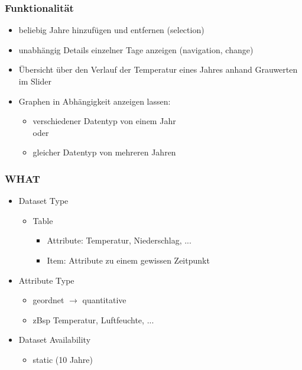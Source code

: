 \documentclass{beamer}
\begin{document}
  \begin{frame}
  \frametitle{Funktionalität}
  \begin{itemize}
    \item beliebig Jahre hinzufügen und entfernen (selection)
    \item unabhängig Details einzelner Tage anzeigen (navigation, change)
    \item Übersicht über den Verlauf der Temperatur eines Jahres anhand Grauwerten im Slider
    \item Graphen in Abhängigkeit anzeigen lassen:
    \begin{itemize}
      \item verschiedener Datentyp von einem Jahr 
      \\ oder
      \item gleicher Datentyp von mehreren Jahren
    \end{itemize}

  \end{itemize}

  \end{frame}

  
  \begin{frame}
  \frametitle{WHAT}
    \begin{itemize}
    \item Dataset Type
      \begin{itemize}
	  \item Table 
	  \begin{itemize}
	   \item Attribute: Temperatur, Niederschlag, ...
	   \item Item: Attribute zu einem gewissen Zeitpunkt
	  \end{itemize}
      \end{itemize}
    \item Attribute Type
      \begin{itemize}
	\item geordnet $\rightarrow$ quantitative
	\item zBsp Temperatur, Luftfeuchte, ...
      \end{itemize}
    \item Dataset Availability
      \begin{itemize}
	\item static (10 Jahre)
      \end{itemize}
    \end{itemize}  
  \end{frame} 
  
\end{document}
